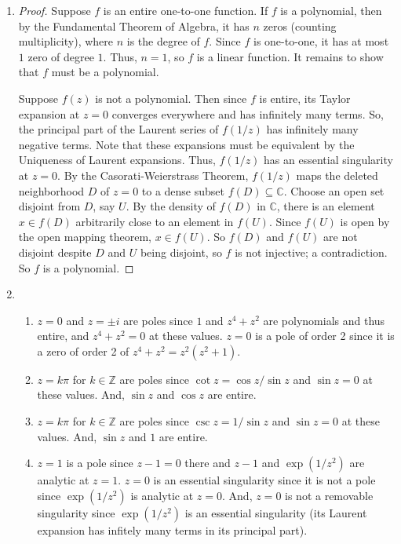 \documentclass[11pt, letterpaper]{article}
\begin{document}
\thispagestyle{firststyle}


\begin{enumerate}
  \item \begin{proof}
    Suppose $f$ is an entire one-to-one function. If $f$ is a polynomial, then by the Fundamental Theorem of Algebra, it has $n$ zeros (counting multiplicity), where $n$ is the degree of $f$. Since $f$ is one-to-one, it has at most $1$ zero of degree $1$. Thus, $n = 1$, so $f$ is a linear function. It remains to show that $f$ must be a polynomial.

    Suppose $f(z)$ is not a polynomial. Then since $f$ is entire, its Taylor expansion at $z = 0$ converges everywhere and has infinitely many terms. So, the principal part of the Laurent series of $f(1/z)$ has infinitely many negative terms. Note that these expansions must be equivalent by the Uniqueness of Laurent expansions. Thus, $f(1/z)$ has an essential singularity at $z = 0$. By the Casorati-Weierstrass Theorem, $f(1/z)$ maps the deleted neighborhood $D$ of $z = 0$ to a dense subset $f(D) \subseteq \mathbb{C}$. Choose an open set disjoint from $D$, say $U$. By the density of $f(D)$ in $\mathbb C$, there is an element $x \in f(D)$ arbitrarily close to an element in $f(U)$. Since $f(U)$ is open by the open mapping theorem, $x \in f(U)$. So $f(D)$ and $f(U)$ are not disjoint despite $D$ and $U$ being disjoint, so $f$ is not injective; a contradiction. So $f$ is a polynomial.
  \end{proof}

  \item \begin{enumerate}
    \item $z = 0$ and $z = \pm i$ are poles since $1$ and $z^4 + z^2$ are polynomials and thus entire, and $z^4 + z^2 = 0$ at these values. $z = 0$ is a pole of order 2 since it is a zero of order 2 of $z^4 + z^2 = z^2(z^2 + 1)$.
    \item $z = k\pi$ for $k \in \mathbb Z$ are poles since $\cot z = \cos z / \sin z$ and $\sin z = 0$ at these values. And, $\sin z$ and $\cos z$ are entire.
    \item $z = k\pi$ for $k \in \mathbb Z$ are poles since $\csc z = 1/\sin z$ and $\sin z = 0$ at these values. And, $\sin z$ and $1$ are entire.
    \item $z = 1$ is a pole since $z - 1 = 0$ there and $z - 1$ and $\exp(1/z^2)$ are analytic at $z = 1$. $z = 0$ is an essential singularity since it is not a pole since $\exp(1/z^2)$ is analytic at $z = 0$. And, $z = 0$ is not a removable singularity since $\exp(1/z^2)$ is an essential singularity (its Laurent expansion has infitely many terms in its principal part).
  \end{enumerate}


\end{enumerate}
\end{document}
